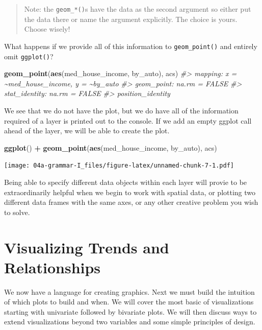 \documentclass[
]{book}
\newenvironment{Shaded}{\begin{snugshade}}{\end{snugshade}}
\newcommand{\CommentTok}[1]{\textcolor[rgb]{0.56,0.35,0.01}{\textit{#1}}}
\newcommand{\KeywordTok}[1]{\textcolor[rgb]{0.13,0.29,0.53}{\textbf{#1}}}
\newcommand{\NormalTok}[1]{#1}
\newcommand{\OperatorTok}[1]{\textcolor[rgb]{0.81,0.36,0.00}{\textbf{#1}}}
\newcommand{\StringTok}[1]{\textcolor[rgb]{0.31,0.60,0.02}{#1}}
\begin{document}
\begin{quote}
Note: the \texttt{geom\_*()}s have the data as the second argument so either put the data there or name the argument explicitly. The choice is yours. Choose wisely!
\end{quote}

What happens if we provide all of this information to \texttt{geom\_point()} and entirely omit \texttt{ggplot()}?

\begin{Shaded}
\begin{Highlighting}[]
\KeywordTok{geom\_point}\NormalTok{(}\KeywordTok{aes}\NormalTok{(med\_house\_income, by\_auto), acs)}
\CommentTok{\#\textgreater{} mapping: x = \textasciitilde{}med\_house\_income, y = \textasciitilde{}by\_auto }
\CommentTok{\#\textgreater{} geom\_point: na.rm = FALSE}
\CommentTok{\#\textgreater{} stat\_identity: na.rm = FALSE}
\CommentTok{\#\textgreater{} position\_identity}
\end{Highlighting}
\end{Shaded}

We see that we do not have the plot, but we do have all of the information required of a layer is printed out to the console. If we add an empty ggplot call ahead of the layer, we will be able to create the plot.

\begin{Shaded}
\begin{Highlighting}[]
\KeywordTok{ggplot}\NormalTok{() }\OperatorTok{+}\StringTok{ }
\StringTok{  }\KeywordTok{geom\_point}\NormalTok{(}\KeywordTok{aes}\NormalTok{(med\_house\_income, by\_auto), acs)}
\end{Highlighting}
\end{Shaded}

\texttt{[image: 04a-grammar-I\_files/figure-latex/unnamed-chunk-7-1.pdf]}

Being able to specify different data objects within each layer will provie to be extraordinarily helpful when we begin to work with spatial data, or plotting two different data frames with the same axes, or any other creative problem you wish to solve.

\hypertarget{visualizing-trends-and-relationships}{%
\chapter{Visualizing Trends and Relationships}\label{visualizing-trends-and-relationships}}

We now have a language for creating graphics. Next we must build the intuition of which plots to build and when. We will cover the most basic of visualizations starting with univariate followed by bivariate plots. We will then discuss ways to extend visualizations beyond two variables and some simple principles of design.
\end{document}

